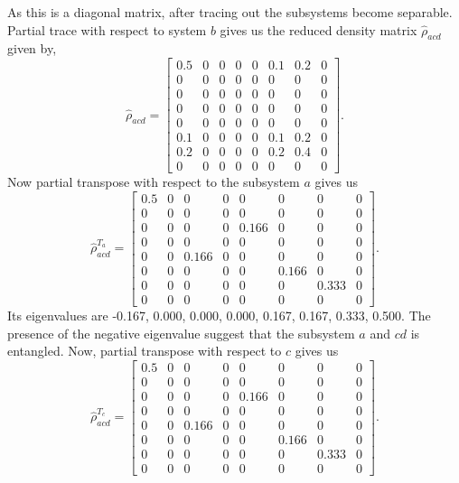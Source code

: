 \documentclass{amsart}
\theoremstyle{plain}
\theoremstyle{definition}
\theoremstyle{plain}
\begin{document}
As this is a diagonal matrix, after tracing out the subsystems become separable.
Partial trace with respect to system $b$ gives us the reduced density matrix $\hat{\rho}_{acd}$ given by,
\begin{equation*}
	\hat{\rho}_{acd} = \left[\begin{matrix}0.5 & 0 & 0 & 0 & 0 & 0.1 & 0.2 & 0\\0 & 0 & 0 & 0 & 0 & 0 & 0 & 0\\0 & 0 & 0 & 0 & 0 & 0 & 0 & 0\\0 & 0 & 0 & 0 & 0 & 0 & 0 & 0\\0 & 0 & 0 & 0 & 0 & 0 & 0 & 0\\0.1 & 0 & 0 & 0 & 0 & 0.1 & 0.2 & 0\\0.2 & 0 & 0 & 0 & 0 & 0.2 & 0.4 & 0\\0 & 0 & 0 & 0 & 0 & 0 & 0 & 0\end{matrix}\right].
\end{equation*}
Now partial transpose with respect to the subsystem $a$ gives us
\begin{equation*}
	\hat{\rho}_{acd}^{T_a} =\left[\begin{matrix}0.5 & 0 & 0 & 0 & 0 & 0 & 0 & 0\\0 & 0 & 0 & 0 & 0 & 0 & 0 & 0\\0 & 0 & 0 & 0 & 0.166 & 0 & 0 & 0\\0 & 0 & 0 & 0 & 0 & 0 & 0 & 0\\0 & 0 & 0.166 & 0 & 0 & 0 & 0 & 0\\0 & 0 & 0 & 0 & 0 & 0.166 & 0 & 0\\0 & 0 & 0 & 0 & 0 & 0 & 0.333 & 0\\0 & 0 & 0 & 0 & 0 & 0 & 0 & 0\end{matrix}\right].
\end{equation*}
Its eigenvalues are -0.167, 0.000, 0.000, 0.000, 0.167, 0.167, 0.333, 0.500. The presence of the negative eigenvalue suggest that the subsystem $a$ and $cd$ is entangled. Now, partial transpose with respect to $c$ gives us 
\begin{equation*}
	\hat{\rho}_{acd}^{T_c}=\left[\begin{matrix}0.5 & 0 & 0 & 0 & 0 & 0 & 0 & 0\\0 & 0 & 0 & 0 & 0 & 0 & 0 & 0\\0 & 0 & 0 & 0 & 0.166 & 0 & 0 & 0\\0 & 0 & 0 & 0 & 0 & 0 & 0 & 0\\0 & 0 & 0.166 & 0 & 0 & 0 & 0 & 0\\0 & 0 & 0 & 0 & 0 & 0.166 & 0 & 0\\0 & 0 & 0 & 0 & 0 & 0 & 0.333 & 0\\0 & 0 & 0 & 0 & 0 & 0 & 0 & 0\end{matrix}\right].
\end{equation*}
\end{document}
